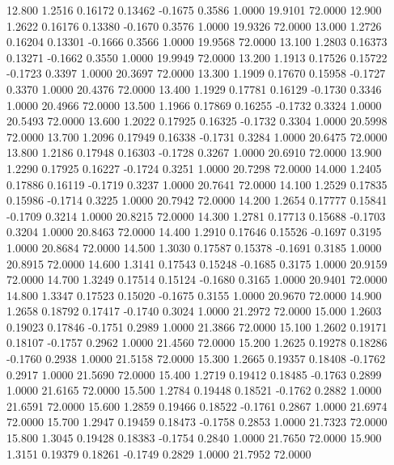   12.800   1.2516   0.16172   0.13462  -0.1675   0.3586   1.0000  19.9101  72.0000
  12.900   1.2622   0.16176   0.13380  -0.1670   0.3576   1.0000  19.9326  72.0000
  13.000   1.2726   0.16204   0.13301  -0.1666   0.3566   1.0000  19.9568  72.0000
  13.100   1.2803   0.16373   0.13271  -0.1662   0.3550   1.0000  19.9949  72.0000
  13.200   1.1913   0.17526   0.15722  -0.1723   0.3397   1.0000  20.3697  72.0000
  13.300   1.1909   0.17670   0.15958  -0.1727   0.3370   1.0000  20.4376  72.0000
  13.400   1.1929   0.17781   0.16129  -0.1730   0.3346   1.0000  20.4966  72.0000
  13.500   1.1966   0.17869   0.16255  -0.1732   0.3324   1.0000  20.5493  72.0000
  13.600   1.2022   0.17925   0.16325  -0.1732   0.3304   1.0000  20.5998  72.0000
  13.700   1.2096   0.17949   0.16338  -0.1731   0.3284   1.0000  20.6475  72.0000
  13.800   1.2186   0.17948   0.16303  -0.1728   0.3267   1.0000  20.6910  72.0000
  13.900   1.2290   0.17925   0.16227  -0.1724   0.3251   1.0000  20.7298  72.0000
  14.000   1.2405   0.17886   0.16119  -0.1719   0.3237   1.0000  20.7641  72.0000
  14.100   1.2529   0.17835   0.15986  -0.1714   0.3225   1.0000  20.7942  72.0000
  14.200   1.2654   0.17777   0.15841  -0.1709   0.3214   1.0000  20.8215  72.0000
  14.300   1.2781   0.17713   0.15688  -0.1703   0.3204   1.0000  20.8463  72.0000
  14.400   1.2910   0.17646   0.15526  -0.1697   0.3195   1.0000  20.8684  72.0000
  14.500   1.3030   0.17587   0.15378  -0.1691   0.3185   1.0000  20.8915  72.0000
  14.600   1.3141   0.17543   0.15248  -0.1685   0.3175   1.0000  20.9159  72.0000
  14.700   1.3249   0.17514   0.15124  -0.1680   0.3165   1.0000  20.9401  72.0000
  14.800   1.3347   0.17523   0.15020  -0.1675   0.3155   1.0000  20.9670  72.0000
  14.900   1.2658   0.18792   0.17417  -0.1740   0.3024   1.0000  21.2972  72.0000
  15.000   1.2603   0.19023   0.17846  -0.1751   0.2989   1.0000  21.3866  72.0000
  15.100   1.2602   0.19171   0.18107  -0.1757   0.2962   1.0000  21.4560  72.0000
  15.200   1.2625   0.19278   0.18286  -0.1760   0.2938   1.0000  21.5158  72.0000
  15.300   1.2665   0.19357   0.18408  -0.1762   0.2917   1.0000  21.5690  72.0000
  15.400   1.2719   0.19412   0.18485  -0.1763   0.2899   1.0000  21.6165  72.0000
  15.500   1.2784   0.19448   0.18521  -0.1762   0.2882   1.0000  21.6591  72.0000
  15.600   1.2859   0.19466   0.18522  -0.1761   0.2867   1.0000  21.6974  72.0000
  15.700   1.2947   0.19459   0.18473  -0.1758   0.2853   1.0000  21.7323  72.0000
  15.800   1.3045   0.19428   0.18383  -0.1754   0.2840   1.0000  21.7650  72.0000
  15.900   1.3151   0.19379   0.18261  -0.1749   0.2829   1.0000  21.7952  72.0000
